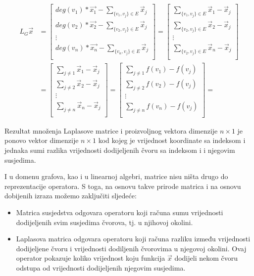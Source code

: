 \documentclass[11pt]{article}
\begin{document}
	\[
		\begin{split}
		L_G \vec{x} & =
		\begin{bmatrix}
			deg(v_1) * \vec{x_1} - \sum_{\{v_1,v_j\} \in E} \vec{x}_j \\
			deg(v_2) * \vec{x_2} - \sum_{\{v_2,v_j\} \in E} \vec{x}_j \\
			\vdots \\
			deg(v_n) * \vec{x_n} - \sum_{\{v_n,v_j\} \in E} \vec{x}_j \\
		\end{bmatrix} =
		\begin{bmatrix}
			\sum_{\{v_1,v_j\} \in E} \vec{x}_1-\vec{x}_j \\
			\sum_{\{v_2,v_j\} \in E} \vec{x}_2-\vec{x}_j \\
			\vdots \\
			\sum_{\{v_2,v_j\} \in E} \vec{x}_n-\vec{x}_j \\
		\end{bmatrix} \\
		& = 
		\begin{bmatrix}
			\sum_{ j \neq 1}  \vec{x}_1-\vec{x}_j \\
			\sum_{ j \neq 2}  \vec{x}_2-\vec{x}_j \\
			\vdots \\
			\sum_{ j \neq n}  \vec{x}_n-\vec{x}_j \\
		\end{bmatrix} =
		\begin{bmatrix}
			\sum_{ j \neq 1}  f(v_1) - f(v_j) \\
			\sum_{ j \neq 2}  f(v_2) - f(v_j) \\
			\vdots \\
			\sum_{ j \neq n}  f(v_n) - f(v_j) \\
		\end{bmatrix} =
		\end{split}
	\]

	Rezultat množenja Laplasove matrice i proizvoljnog vektora dimenzije $n \times 1$ je ponovo vektor dimenzije $n \times 1$
	kod kojeg je vrijednost koordinate sa indeksom i jednaka sumi razlika vrijednosti dodijeljenih čvoru sa indeksom i i njegovim susjedima.

	I u domenu grafova, kao i u linearnoj algebri, matrice nisu ništa drugo do reprezentacije operatora. 
	S toga, na osnovu takve prirode matrica i na osnovu dobijenih izraza možemo zaključiti sljedeće:
	\begin{itemize}
		\item Matrica susjedstva odgovara operatoru koji računa sumu vrijednosti dodijeljenih svim susjedima čvorova, tj. u njihovoj okolini.
		\item Laplasova matrica odgovara operatoru koji računa razliku između vrijednosti dodijeljene čvoru i vrijednosti dodiljenih
		čvorovima u njegovoj okolini. 
		Ovaj operator pokazuje koliko vrijednost koju funkcija $\vec{x}$ dodijeli nekom čvoru odstupa od vrijednosti dodijeljenih njegovim susjedima.
	\end{itemize}
\end{document}
